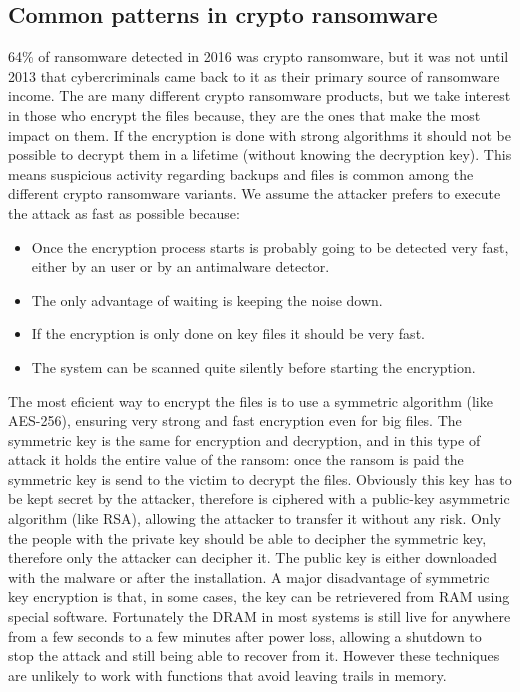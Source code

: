 \subsection{Common patterns in crypto ransomware}
64\% of ransomware detected in 2016 was crypto ransomware\cite{ransomware_digital_extortion}, but it was not until 2013 that cybercriminals came back to it as their primary source of ransomware income\cite{ransomware_oReilly}.
The are many different crypto ransomware products, but we take interest in those who encrypt the files because, they are the ones that make the most impact on them.
If the encryption is done with strong algorithms it should not be possible to decrypt them in a lifetime (without knowing the decryption key).
\linej
\linej
This means suspicious activity regarding backups and files is common among the different crypto ransomware variants.
We assume the attacker prefers to execute the attack as fast as possible because:
\begin{itemize}
\item Once the encryption process starts is probably going to be detected very fast, either by an user or by an antimalware detector.
\item The only advantage of waiting is keeping the noise down.
\item If the encryption is only done on key files it should be very fast.
\item The system can be scanned quite silently before starting the encryption.
\end{itemize}
\linej
The most eficient way to encrypt the files is to use a symmetric algorithm (like AES-256), ensuring very strong and fast encryption even for big files.
The symmetric key is the same for encryption and decryption, and in this type of attack it holds the entire value of the ransom: once the ransom is paid the symmetric key is send to the victim to decrypt the files.
\linej
Obviously this key has to be kept secret by the attacker, therefore is ciphered with a public-key asymmetric algorithm (like RSA), allowing the attacker to transfer it without any risk.
Only the people with the private key should be able to decipher the symmetric key, therefore only the attacker can decipher it.
The public key is either downloaded with the malware or after the installation.
\linej
A major disadvantage of symmetric key encryption is that, in some cases, the key can be retrievered from RAM using special software.
Fortunately the DRAM in most systems is still live for anywhere from a few seconds to a few minutes after power loss, allowing a shutdown to stop the attack and still being able to recover from it.
However these techniques are unlikely to work with functions that avoid leaving trails in memory\cite{ransomware_oReilly}.

